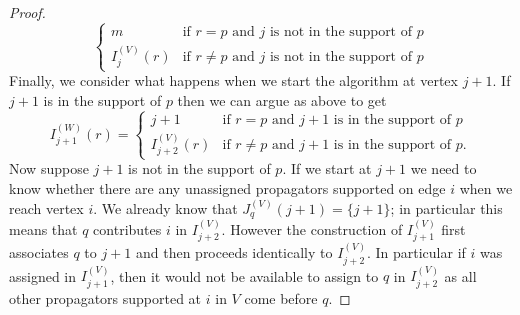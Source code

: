 \documentclass[11pt]{article}
\theoremstyle{remark}
\theoremstyle{definition}
\begin{document}
\begin{proof}
\[\begin{cases}
       m & \text{if $r =p$ and $j$ is not in the support of $p$} \\
       I_{j}^{(V)}(r) & \text{if $r\neq p$ and $j$ is not in the support of $p$}\end{cases}
       \] 
Finally, we consider what happens when we start the algorithm at vertex $j+1$. If $j+1$ is in the support of $p$ then we can argue as above to get
\[
       I_{j+1}^{(W)}(r)  = \begin{cases}
         j+1 & \text{if $r=p$ and $j+1$ is in the support of $p$}\\
         I_{j+2}^{(V)}(r) & \text{if $r\neq p$ and $j+1$ is in the support of $p$}.
       \end{cases}
       \]
Now suppose $j+1$ is not in the support of $p$. If we start at $j+1$ we need to know whether there are any unassigned propagators supported on edge $i$ when we reach vertex $i$. We already know that $J_q^{(V)}(j+1) = \{j+1\}$; in particular this means that $q$ contributes $i$ in $I_{j+2}^{(V)}$.  However the construction of $I^{(V)}_{j+1}$ first associates $q$ to $j+1$ and then proceeds identically to $I^{(V)}_{j+2}$.  In particular if $i$ was assigned in $I^{(V)}_{j+1}$, then it would not be available to assign to $q$ in $I^{(V)}_{j+2}$ as all other propagators supported at $i$ in $V$ come before $q$. 


\end{proof}
\end{document}
